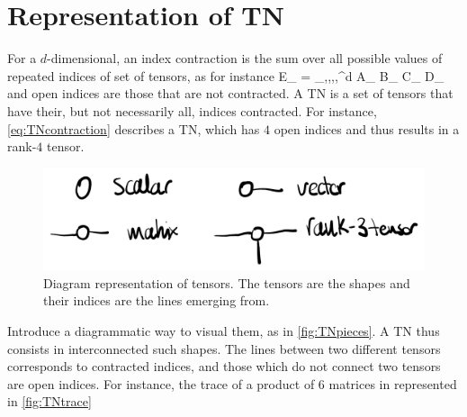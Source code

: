	\section{Representation of TN}

		For a $d$-dimensional, an index contraction is the sum over all possible values of repeated indices of set of tensors, as for instance
		\be E_{\alpha\beta\gamma\delta} = \sum_{\mu,\nu,\rho,\sigma,}^d A_{\mu\nu\rho\delta} B_{\nu\alpha\tau} C_{\rho\sigma\tau\beta} D_{\sigma\gamma\mu} \label{eq:TNcontraction} \ee
		and open indices are those that are not contracted. A TN is a set of tensors that have their, but not necessarily all, indices contracted. For instance, \eqref{eq:TNcontraction} describes a TN, which has $4$ open indices and thus results in a rank-$4$ tensor.

		\begin{figure}[h!]
            \centering
            \includegraphics[scale=0.2]{graphs/TNpieces.png}
            \caption{Diagram representation of tensors. The tensors are the shapes and their indices are the lines emerging from.}
            \label{fig:TNpieces}
        \end{figure}

		Introduce a diagrammatic way to visual them, as in \autoref{fig:TNpieces}. A TN thus consists in interconnected such shapes. The lines between two different tensors corresponds to contracted indices, and those which do not connect two tensors are open indices. For instance, the trace of a product of $6$ matrices in represented in \autoref{fig:TNtrace}

